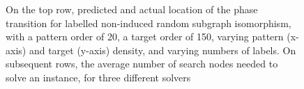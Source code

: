 \documentclass[twoside,11pt]{article}
\begin{document}
\begin{figure}[t]
    \caption{On the top row, predicted and actual location of the phase transition for labelled
    non-induced random subgraph isomorphism, with a pattern order of 20, a target order of 150,
    varying pattern (x-axis) and target (y-axis) density, and varying numbers of labels. On
    subsequent rows, the average number of search nodes needed to solve an instance, for three
    different solvers}\label{figure:labels}
\end{figure}
\end{document}
